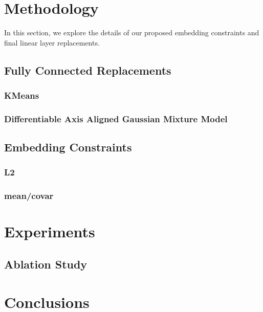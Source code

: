 \documentclass[10pt,twocolumn,letterpaper]{article}
\begin{document}
\section{Methodology}

In this section, we explore the details of our proposed embedding constraints and final linear layer replacements.

\subsection{Fully Connected Replacements}

\subsubsection{KMeans}

\subsubsection{Differentiable Axis Aligned Gaussian Mixture Model}


\subsection{Embedding Constraints}

\subsubsection{L2}

\subsubsection{mean/covar}






\section{Experiments}


\subsection{Ablation Study}



\section{Conclusions}







	
	
\end{document}
